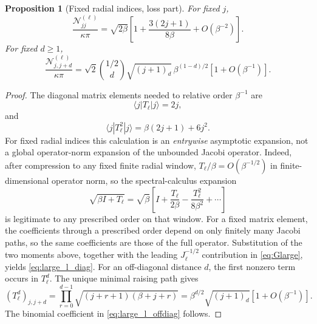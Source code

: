 \documentclass[10pt,a4paper]{amsart}
\newtheorem{proposition}{Proposition}
\begin{document}
\begin{proposition}[Fixed radial indices, loss part]
For fixed $j$,
\begin{equation}
 \frac{\mathcal N^{(\ell)}_{jj}}{\kappa\pi}
 =
 \sqrt{2\beta}
 \left[
 1+
 \frac{3(2j+1)}{8\beta}
 +O(\beta^{-2})
 \right].
 \label{eq:large_l_diag}
\end{equation}
For fixed $d\ge1$,
\begin{equation}
 \frac{\mathcal N^{(\ell)}_{j,j+d}}{\kappa\pi}
 =
 \sqrt2
 \binom{1/2}{d}
 \sqrt{(j+1)_d}\,
 \beta^{(1-d)/2}
 \left[1+O(\beta^{-1})\right].
 \label{eq:large_l_offdiag}
\end{equation}
\end{proposition}

\begin{proof}
The diagonal matrix elements needed to relative order $\beta^{-1}$ are
\begin{equation}
 \langle j|T_\ell|j\rangle=2j,
\end{equation}
and
\begin{equation}
 \langle j|T_\ell^2|j\rangle
 =
 \beta(2j+1)+6j^2.
\end{equation}
For fixed radial indices this calculation is an \emph{entrywise}
asymptotic expansion, not a global operator-norm expansion of the unbounded
Jacobi operator.  Indeed, after compression to any fixed finite radial window,
$T_\ell/\beta=O(\beta^{-1/2})$ in finite-dimensional operator norm, so the
spectral-calculus expansion
\begin{equation}
 \sqrt{\beta I+T_\ell}
 =
 \sqrt\beta
 \left[
 I+\frac{T_\ell}{2\beta}
 -\frac{T_\ell^2}{8\beta^2}+\cdots
 \right]
\end{equation}
is legitimate to any prescribed order on that window.  For a fixed matrix
element, the coefficients through a prescribed order depend on only finitely
many Jacobi paths, so the same coefficients are those of the full operator.
Substitution of the two moments above, together with the leading
$J_\ell^{-1/2}$ contribution in \eqref{eq:Glarge}, yields
\eqref{eq:large_l_diag}.  For an off-diagonal
distance $d$, the first nonzero term occurs in $T_\ell^d$.  The unique minimal
raising path gives
\begin{equation}
 (T_\ell^d)_{j,j+d}
 =
 \prod_{r=0}^{d-1}
 \sqrt{(j+r+1)(\beta+j+r)}
 =
 \beta^{d/2}\sqrt{(j+1)_d}
 [1+O(\beta^{-1})].
\end{equation}
The binomial coefficient in \eqref{eq:large_l_offdiag} follows.
\end{proof}
\end{document}
